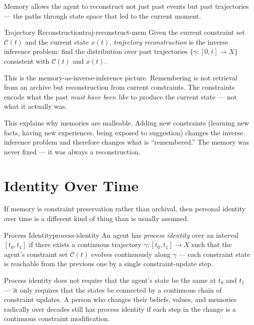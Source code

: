 Memory allows the agent to reconstruct not just past events but past
trajectories — the paths through state space that led to the current moment.

\begin{definition}{Trajectory Reconstruction}{traj-reconstruct-mem}
  Given the current constraint set $\mathcal{C}(t)$ and the current state
  $x(t)$, \emph{trajectory reconstruction} is the inverse inference
  problem: find the distribution over past trajectories
  $\{\gamma : [0,t] \to X\}$ consistent with $\mathcal{C}(t)$ and $x(t)$.
\end{definition}

This is the memory-as-inverse-inference picture. Remembering is not
retrieval from an archive but reconstruction from current constraints.
The constraints encode what the past \emph{must have been like} to
produce the current state — not what it actually was.

This explains why memories are malleable. Adding new constraints (learning
new facts, having new experiences, being exposed to suggestion) changes
the inverse inference problem and therefore changes what is ``remembered.''
The memory was never fixed — it was always a reconstruction.

\section{Identity Over Time}

If memory is constraint preservation rather than archival, then personal
identity over time is a different kind of thing than is usually assumed.

\begin{definition}{Process Identity}{process-identity}
  An agent has \emph{process identity} over an interval $[t_0, t_1]$
  if there exists a continuous trajectory $\gamma : [t_0, t_1] \to X$
  such that the agent's constraint set $\mathcal{C}(t)$ evolves
  continuously along $\gamma$ — each constraint state is reachable from
  the previous one by a single constraint-update step.
\end{definition}

Process identity does not require that the agent's state be the same at
$t_0$ and $t_1$ — it only requires that the states be connected by a
continuous chain of constraint updates. A person who changes their beliefs,
values, and memories radically over decades still has process identity if
each step in the change is a continuous constraint modification.

